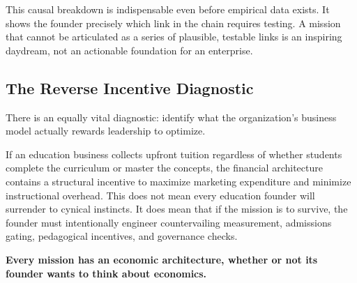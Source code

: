 This causal breakdown is indispensable even before empirical data exists. It shows the founder precisely which link in the chain requires testing. A mission that cannot be articulated as a series of plausible, testable links is an inspiring daydream, not an actionable foundation for an enterprise.

\subsection{The Reverse Incentive Diagnostic}

There is an equally vital diagnostic: identify what the organization's business model actually rewards leadership to optimize.

If an education business collects upfront tuition regardless of whether students complete the curriculum or master the concepts, the financial architecture contains a structural incentive to maximize marketing expenditure and minimize instructional overhead. This does not mean every education founder will surrender to cynical instincts. It does mean that if the mission is to survive, the founder must intentionally engineer countervailing measurement, admissions gating, pedagogical incentives, and governance checks.

\textbf{Every mission has an economic architecture, whether or not its founder wants to think about economics.}
